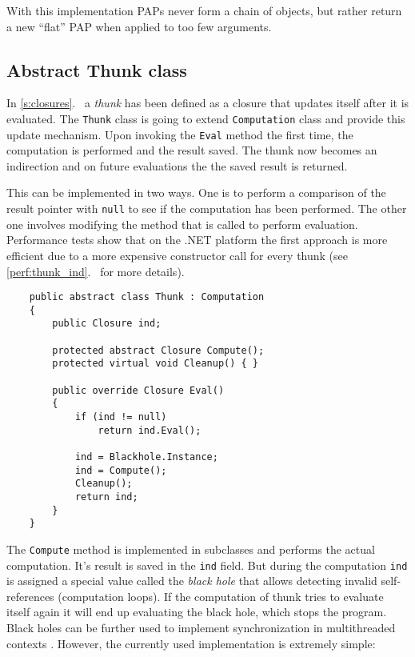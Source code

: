 \documentclass[en]{pracamgr}
\newcommand{\myref}[1]{\ref{#1}.~\textit{\nameref{#1}}}
\begin{document}
With this implementation PAPs never form a chain of objects, but rather return a new ``flat'' PAP when applied to too few arguments.

\subsection{Abstract Thunk class}\label{s:thunk_class}

In \myref{s:closures} a \textit{thunk} has been defined as a
closure that updates itself after it is evaluated.
The \texttt{Thunk} class is going to extend
\texttt{Computation} class and provide this update
mechanism. Upon invoking the \texttt{Eval} method the first
time, the computation is performed and the result saved.
The thunk now becomes an indirection and on future evaluations
the the saved result is returned.

This can be implemented in two ways. One is to perform a comparison
of the result pointer with \texttt{null} to see if
the computation has been performed.
The other one involves modifying the method that is called
to perform evaluation.
Performance tests show that on the .NET platform the first approach is more efficient
due to a more expensive constructor call for every thunk
(see \myref{perf:thunk_ind} for more details).

\newpage
\begin{verbatim}
    public abstract class Thunk : Computation
    {
        public Closure ind;

        protected abstract Closure Compute();
        protected virtual void Cleanup() { }
        
        public override Closure Eval()
        {
            if (ind != null) 
                return ind.Eval();

            ind = Blackhole.Instance;
            ind = Compute();
            Cleanup();
            return ind;
        }
    }
\end{verbatim}

The \texttt{Compute} method is implemented in subclasses
and performs the actual computation.
It's result is saved in the \texttt{ind} field.
But during the computation \texttt{ind} is assigned a special
value called the \textit{black hole} that allows detecting
invalid self-references (computation loops).
If the computation of thunk tries to evaluate itself
again it will end up evaluating the black hole, which stops
the program. Black holes can
be further used to implement synchronization in
multithreaded contexts \cite{multiprocessor}.
However, the currently used implementation is extremely simple:
\end{document}
